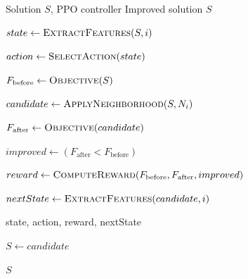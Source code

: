 \begin{algorithm}[H]
\caption{PPO-Guided Local Search}
\label{alg:ppo_local_search}
\begin{algorithmic}[1]

\Require Solution $S$, PPO controller
\Ensure Improved solution $S$


    \State $state \gets
    \Call{ExtractFeatures}{S,i}$

    \State $action \gets
    \Call{SelectAction}{state}$

    \State {}

    \State $F_{\text{before}}
        \gets
        \Call{Objective}{S}$

    \State $candidate \gets
        \Call{ApplyNeighborhood}
        {S,N_i}$

    \State $F_{\text{after}}
        \gets
        \Call{Objective}{candidate}$

    \State $improved
        \gets
        (F_{\text{after}} < F_{\text{before}})$

    \State $reward \gets
        \Call{ComputeReward}
        {F_{\text{before}},
         F_{\text{after}},
         improved}$

    \State $nextState \gets
        \Call{ExtractFeatures}
        {candidate,i}$

    \State {}
        {state,
         action,
         reward,
         nextState}


        \State $S \gets candidate$

    \EndIf

\EndFor

\State \Return $S$

\end{algorithmic}
\end{algorithm}